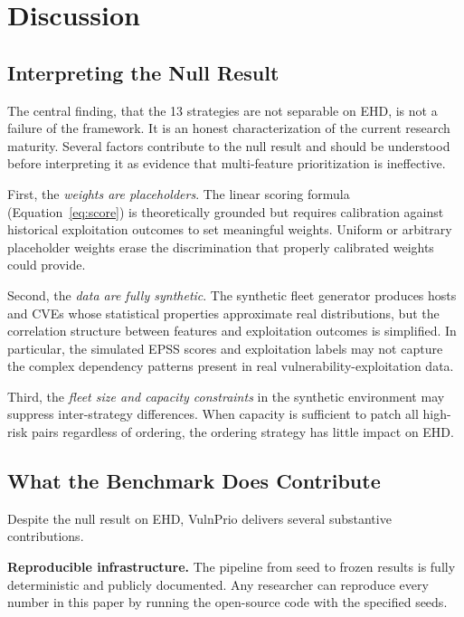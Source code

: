 \documentclass[journal]{IEEEtran}
\begin{document}
\section{Discussion}
\label{sec:discussion}

\subsection{Interpreting the Null Result}

The central finding, that the 13 strategies are not separable
on EHD, is not a failure of the framework.
It is an honest characterization of the current research
maturity.  Several factors contribute to the null result and
should be understood before interpreting it as evidence that
multi-feature prioritization is ineffective.

First, the \emph{weights are placeholders}.  The linear scoring
formula (Equation~\ref{eq:score}) is theoretically grounded but
requires calibration against historical exploitation outcomes to
set meaningful weights.  Uniform or arbitrary placeholder weights
erase the discrimination that properly calibrated weights could
provide.

Second, the \emph{data are fully synthetic}.  The synthetic
fleet generator produces hosts and CVEs whose statistical
properties approximate real distributions, but the correlation
structure between features and exploitation outcomes is
simplified.  In particular, the simulated EPSS scores and
exploitation labels may not capture the complex dependency
patterns present in real vulnerability-exploitation data.

Third, the \emph{fleet size and capacity constraints} in the
synthetic environment may suppress inter-strategy differences.
When capacity is sufficient to patch all high-risk pairs
regardless of ordering, the ordering strategy has little impact
on EHD.

\subsection{What the Benchmark Does Contribute}

Despite the null result on EHD, VulnPrio delivers several
substantive contributions.

\textbf{Reproducible infrastructure.} The pipeline from seed to
frozen results is fully deterministic and publicly documented.
Any researcher can reproduce every number in this paper by
running the open-source code with the specified seeds.
\end{document}
